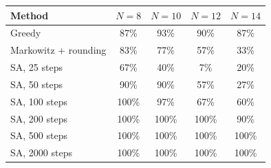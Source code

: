 \begin{tabular}{lcccc}
\toprule
Method & $N=8$ & $N=10$ & $N=12$ & $N=14$ \\
\midrule
Greedy & 87\% & 93\% & 90\% & 87\% \\
Markowitz + rounding & 83\% & 77\% & 57\% & 33\% \\
SA, 25 steps & 67\% & 40\% & 7\% & 20\% \\
SA, 50 steps & 90\% & 90\% & 57\% & 27\% \\
SA, 100 steps & 100\% & 97\% & 67\% & 60\% \\
SA, 200 steps & 100\% & 100\% & 100\% & 90\% \\
SA, 500 steps & 100\% & 100\% & 100\% & 100\% \\
SA, 2000 steps & 100\% & 100\% & 100\% & 100\% \\
\bottomrule
\end{tabular}
